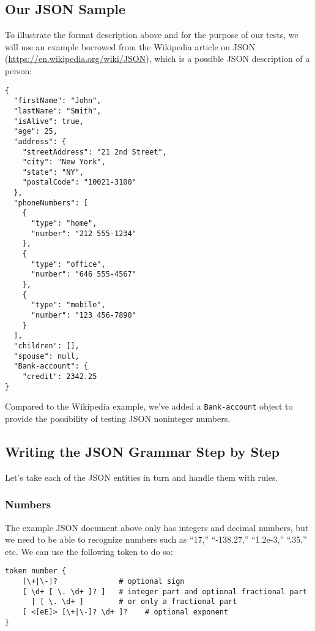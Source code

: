 \subsection{Our JSON Sample}

To illustrate the format description above and for the 
purpose of our tests, we will use an example borrowed from 
the Wikipedia article on JSON 
(\url{https://en.wikipedia.org/wiki/JSON}), which is a 
possible JSON description of a person:

\begin{verbatim}
{
  "firstName": "John",
  "lastName": "Smith",
  "isAlive": true,
  "age": 25,
  "address": {
    "streetAddress": "21 2nd Street",
    "city": "New York",
    "state": "NY",
    "postalCode": "10021-3100"
  },
  "phoneNumbers": [
    {
      "type": "home",
      "number": "212 555-1234"
    },
    {
      "type": "office",
      "number": "646 555-4567"
    },
    {
      "type": "mobile",
      "number": "123 456-7890"
    }
  ],
  "children": [],
  "spouse": null,  
  "Bank-account": {
    "credit": 2342.25
}
\end{verbatim}

Compared to the Wikipedia example, we've added a 
\verb'Bank-account' object to provide the possibility 
of testing JSON noninteger numbers.
 
\subsection{Writing the JSON Grammar Step by Step}

Let's take each of the JSON entities in turn and handle 
them with rules.

\subsubsection{Numbers}

The example JSON document above only has integers and decimal 
numbers, but we need to be able to recognize numbers such 
as ``17,'' ``-138.27,'' ``1.2e-3,'' ``.35,'' etc. We can 
use the following token to do so:

\begin{verbatim}
token number {
    [\+|\-]?              # optional sign
    [ \d+ [ \. \d+ ]? ]   # integer part and optional fractional part
      | [ \. \d+ ]        # or only a fractional part
    [ <[eE]> [\+|\-]? \d+ ]?    # optional exponent
}
\end{verbatim}

